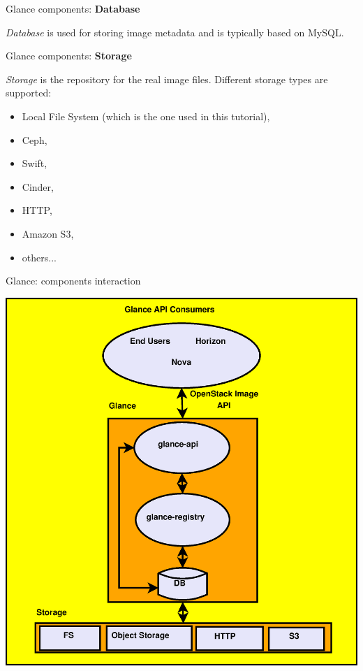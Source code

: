 \documentclass[english,serif,mathserif]{beamer}
\begin{document}
\begin{frame}{Glance components: \textbf{Database}}

\textit{Database} is used for storing image metadata and is typically based on MySQL.

\end{frame}

\begin{frame}{Glance components: \textbf{Storage}}

\textit{Storage} is the repository for the real image files. 
Different storage types are supported:

\begin{itemize}
\item Local File System (which is the one used in this tutorial),
\item Ceph,
\item Swift,
\item Cinder,
\item HTTP,
\item Amazon S3,
\item others...
\end{itemize} 

\end{frame}

\begin{frame}{Glance: components interaction}

\centerline{\includegraphics[scale=0.30]{glance.eps}}

\end{frame}
\end{document}
